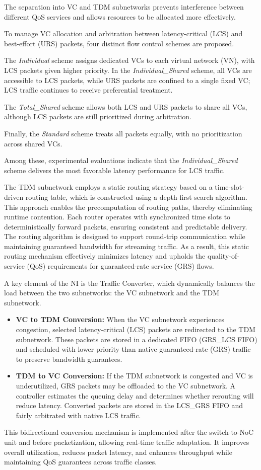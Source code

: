The separation into VC and TDM subnetworks prevents interference between different QoS services and allows resources to be allocated more effectively.


To manage \ac{VC} allocation and arbitration between latency-critical (LCS) and best-effort (URS) packets, four distinct flow control schemes are proposed. 

The \textit{Individual} scheme assigns dedicated VCs to each virtual network (VN), with LCS packets given higher priority. In the \textit{Individual\_Shared} scheme, all VCs are accessible to LCS packets, while URS packets are confined to a single fixed VC; LCS traffic continues to receive preferential treatment.

The \textit{Total\_Shared} scheme allows both LCS and URS packets to share all VCs, although LCS packets are still prioritized during arbitration. 

Finally, the \textit{Standard} scheme treats all packets equally, with no prioritization across shared VCs. 

Among these, experimental evaluations indicate that the \textit{Individual\_Shared} scheme delivers the most favorable latency performance for LCS traffic.


The \ac{TDM} subnetwork employs a static routing strategy based on a time-slot-driven routing table, which is constructed using a depth-first search algorithm. 
This approach enables the precomputation of routing paths, thereby eliminating runtime contention. Each router operates with synchronized time slots to deterministically forward packets, ensuring consistent and predictable delivery. 
The routing algorithm is designed to support round-trip communication while maintaining guaranteed bandwidth for streaming traffic. As a result, this static routing mechanism effectively minimizes latency and upholds the quality-of-service (QoS) requirements for guaranteed-rate service (GRS) flows.


A key element of the NI is the Traffic Converter, which dynamically balances the load between the two subnetworks: the \ac{VC} subnetwork and the \ac{TDM} subnetwork.

\begin{itemize}
    \item \textbf{VC to TDM Conversion:} When the VC subnetwork experiences congestion, selected latency-critical (LCS) packets are redirected to the TDM subnetwork. These packets are stored in a dedicated FIFO (GRS\_LCS FIFO) and scheduled with lower priority than native guaranteed-rate (GRS) traffic to preserve bandwidth guarantees.
    \item \textbf{TDM to VC Conversion:} If the TDM subnetwork is congested and VC is underutilized, GRS packets may be offloaded to the VC subnetwork. A controller estimates the queuing delay and determines whether rerouting will reduce latency. Converted packets are stored in the LCS\_GRS FIFO and fairly arbitrated with native LCS traffic.
\end{itemize}

This bidirectional conversion mechanism is implemented after the switch-to-NoC unit and before packetization, allowing real-time traffic adaptation. It improves overall utilization, reduces packet latency, and enhances throughput while maintaining QoS guarantees across traffic classes.

